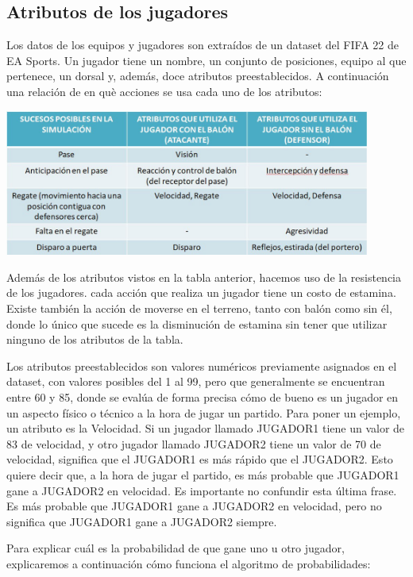 \documentclass{article}
\begin{document}
\subsection{Atributos de los jugadores}
Los datos de los equipos y jugadores son extraídos de un dataset del FIFA 22 de EA Sports. Un jugador tiene un nombre, 
un conjunto de posiciones, equipo al que pertenece, un dorsal y, además, doce atributos preestablecidos. A 
continuación una relación de en què acciones se usa cada uno de los atributos:

\includegraphics*[width=0.9\textwidth]{images/attributed_table.jpg}
\bigskip

Además de los atributos vistos en la tabla anterior, hacemos uso de la resistencia de los jugadores. cada acción que realiza un jugador tiene un costo de estamina. Existe también la acción de moverse en  el terreno, tanto con balón como sin él, donde lo único que sucede es la disminución de estamina sin tener que utilizar ninguno de los atributos de la tabla.

Los atributos preestablecidos son valores numéricos previamente asignados en el dataset, con valores posibles del 1 al 
99, pero que generalmente se encuentran entre 60 y 85, donde se evalúa de forma precisa cómo de bueno es un jugador en 
un aspecto físico o técnico a la hora de jugar un partido. Para poner un ejemplo, un atributo es la Velocidad. Si un 
jugador llamado JUGADOR1 tiene un valor de 83 de velocidad, y otro jugador llamado JUGADOR2 tiene un valor de 70 de 
velocidad, significa que el JUGADOR1 es más rápido que el JUGADOR2. Esto quiere decir que, a la hora de jugar el 
partido, es más probable que JUGADOR1 gane a JUGADOR2 en velocidad. Es importante no confundir esta última frase. 
Es más probable que JUGADOR1 gane a JUGADOR2 en velocidad, pero no significa que JUGADOR1 gane a JUGADOR2 siempre.

Para explicar cuál es la probabilidad de que gane uno u otro jugador,
explicaremos a continuación cómo funciona el algoritmo de probabilidades:
\end{document}
